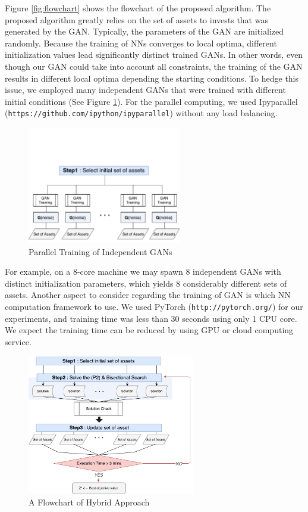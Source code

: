 \documentclass[11pt]{article}
\begin{document}
	Figure \ref{fig:flowchart} shows the flowchart of the proposed algorithm. The proposed algorithm greatly relies on the set of assets to invests that was generated by the GAN. Typically, the parameters of the GAN are initialized randomly. Because the training of NNs converges to local optima, different initialization values lead significantly distinct trained GANs. In other words, even though our GAN could take into account all constraints, the training of the GAN results in different local optima depending the starting conditions. To hedge this issue, we employed many independent GANs that were trained with different initial conditions (See Figure \ref{fig:parallelGAN}). For the parallel computing, we used Ipyparallel (\texttt{https://github.com/ipython/ipyparallel}) without any load balancing. 
	\begin{figure}[] 
		\begin{center}
			\includegraphics[width=0.6\textwidth]{step1}
			\caption{Parallel Training of Independent GANs} \label{fig:parallelGAN}
		\end{center}
	\end{figure}
	For example, on a 8-core machine we may spawn 8 independent GANs with distinct initialization parameters, which yields 8 considerably different sets of assets. Another aspect to consider regarding the training of GAN is which NN computation framework to use. We used PyTorch (\texttt{http://pytorch.org/}) for our experiments, and training time was less than 30 seconds using only 1 CPU core. We expect the training time can be reduced by using GPU or cloud computing service. 
	
	\begin{figure}[] 
		\begin{center}
			\includegraphics[width=0.65\textwidth]{step3}
			\caption{A Flowchart of Hybrid Approach} \label{fig:entire}
		\end{center}
	\end{figure}
	
\end{document}
